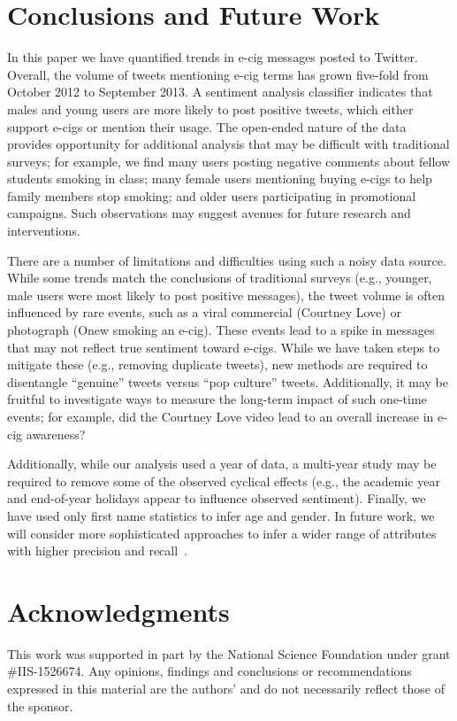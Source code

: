 \documentclass{sig-alternate}
\begin{document}
\section{Conclusions and Future Work}
\label{s.conclusion}

In this paper we have quantified trends in e-cig messages posted to
Twitter. Overall, the volume of tweets mentioning e-cig terms has grown
five-fold from October 2012 to September 2013. A sentiment analysis classifier
indicates that males and young users are more likely to post positive tweets,
which either support e-cigs or mention their usage. The open-ended nature of
the data provides opportunity for additional analysis that may be difficult
with traditional surveys; for example, we find many users posting negative
comments about fellow students smoking in class; many female users mentioning
buying e-cigs to help family members stop smoking; and older users
participating in promotional campaigns. Such observations may suggest avenues
for future research and interventions.

There are a number of limitations and difficulties using such a noisy data
source. While some trends match the conclusions of traditional surveys (e.g.,
younger, male users were most likely to post positive messages), the tweet
volume is often influenced by rare events, such as a viral commercial
(Courtney Love) or photograph (Onew smoking an e-cig). These events lead to a
spike in messages that may not reflect true sentiment toward e-cigs. While we
have taken steps to mitigate these (e.g., removing duplicate tweets), new
methods are required to disentangle ``genuine'' tweets versus ``pop culture''
tweets. Additionally, it may be fruitful to investigate ways to measure the
long-term impact of such one-time events; for example, did the Courtney Love
video lead to an overall increase in e-cig awareness?

Additionally, while our analysis used a year of data, a multi-year study may
be required to remove some of the observed cyclical effects (e.g., the
academic year and end-of-year holidays appear to influence observed
sentiment). Finally, we have used only first name statistics to infer age and
gender. In future work, we will consider more sophisticated approaches to
infer a wider range of attributes with higher precision and
recall~\cite{culotta2015predicting}.


\section{Acknowledgments}
This work was supported in part by the National Science Foundation under grant
\#IIS-1526674.  Any opinions, findings and conclusions or recommendations
expressed in this material are the authors' and do not necessarily reflect
those of the sponsor.


%
%
\end{document}
